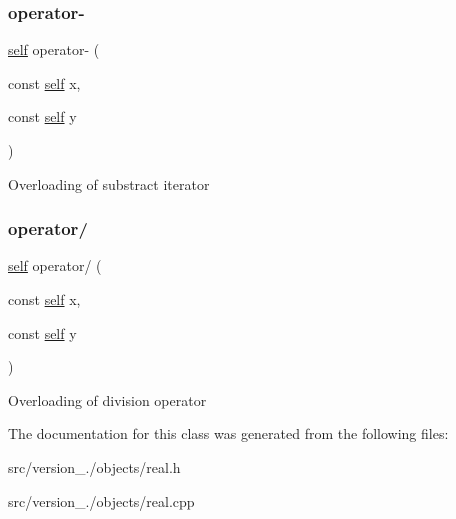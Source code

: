 \subsubsection{\texorpdfstring{operator-\/}{operator-}}
{\footnotesize\ttfamily \hyperlink{classez_1_1objects_1_1Real}{self} operator-\/ (\begin{DoxyParamCaption}\item[{const \hyperlink{classez_1_1objects_1_1Real}{self}}]{x,  }\item[{const \hyperlink{classez_1_1objects_1_1Real}{self}}]{y }\end{DoxyParamCaption})\hspace{0.3cm}{\ttfamily [friend]}}

Overloading of substract iterator \mbox{\label{classez_1_1objects_1_1Real_aa69c5e8b6898bb99a6f4d6e8962560c8}} 
\subsubsection{\texorpdfstring{operator/}{operator/}}
{\footnotesize\ttfamily \hyperlink{classez_1_1objects_1_1Real}{self} operator/ (\begin{DoxyParamCaption}\item[{const \hyperlink{classez_1_1objects_1_1Real}{self}}]{x,  }\item[{const \hyperlink{classez_1_1objects_1_1Real}{self}}]{y }\end{DoxyParamCaption})\hspace{0.3cm}{\ttfamily [friend]}}

Overloading of division operator 

The documentation for this class was generated from the following files\+:\begin{DoxyCompactItemize}
\item 
src/version\+\_./objects/real.\+h\item 
src/version\+\_./objects/real.\+cpp\end{DoxyCompactItemize}
